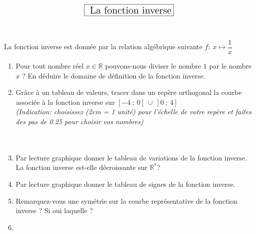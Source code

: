 \documentclass[a4paper,10pt]{article}
\newtheorem{defi}{Définition}
\newcommand{\R}{\mathbb{R}}
\begin{document}
	$$\fbox{\text{\Large{ La fonction inverse}}}$$
	\hfil\\\hfil\\
	\noindent La fonction inverse est donnée par la relation algébrique suivante \quad
	$f:~x \longmapsto \dfrac{1}{x}$\\
	\begin{enumerate}
		\item Pour tout nombre réel $x\in\R$ pouvons-nous diviser le nombre $1$ par le nombre $x$ ? En déduire le domaine de définition de la fonction inverse. \\
		\item Grâce à un tableau de valeurs, tracer dans un repère orthogonal la courbe associée à la fonction inverse sur $[-4~;~0[~\cup~]0~;~4]$ \\
		\textit{(Indication: choisissez (2cm = 1 unité) pour l'échelle de votre repère et faites des pas de 0.25 pour choisir vos nombres)}\\ \hfill\\
		\noindent{}\hfill\\
		\item Par lecture graphique donner le tableau de variations de la fonction inverse. La fonction inverse est-elle décroissante sur $\R^*$?\\
	  
		\item Par lecture graphique donner le tableau de signes de la fonction inverse.\\
		\item Remarquez-vous une symétrie sur la courbe représentative de la fonction inverse ? Si oui laquelle ?\\
		\item
\end{enumerate}
\end{document}
